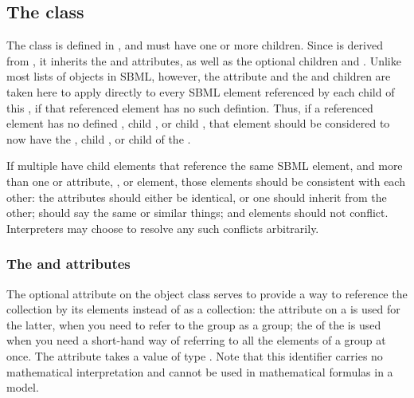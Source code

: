 \subsection{The  class}
\label{listofmembers-class}

The \ListOfMembers class is defined in , and must have one or more \Member children.  Since \ListOfMembers is derived from \SBase, it inherits the  and  attributes, as well as the optional children \Notes and \Annotation.  Unlike most lists of objects in SBML, however, the  attribute and the \Notes and \Annotation children are taken here to apply directly to every SBML element referenced by each child \Member of this \ListOfMembers, if that referenced element has no such defintion.  Thus, if a referenced element has no defined , child \Notes, or child \Annotation, that element should be considered to now have the , child \Notes, or child \Annotation of the \ListOfMembers.

If multiple \ListOfMembers have child \Member elements that reference the same SBML element, and more than one \ListOfMembers or \Member {}  attribute, \Notes, or \Annotation element, those \Member elements should be consistent with each other:  the  attributes should either be identical, or one should inherit from the other; \Notes should say the same or similar things; and \Annotation elements should not conflict.  Interpreters may choose to resolve any such conflicts arbitrarily.

\subsubsection{The \fixttspace{} and \fixttspace{} attributes}
\label{listofmembers-idname-attributes}

The optional  attribute on the \ListOfMembers object class serves to provide a way to reference the collection by its elements instead of as a collection:  the  attribute on a \Group is used for the latter, when you need to refer to the group as a group; the  of the \ListOfMembers is used when you need a short-hand way of referring to all the elements of a group at once.  The attribute takes a value of type .  Note that this identifier carries no mathematical interpretation and cannot be used in mathematical formulas in a model.


